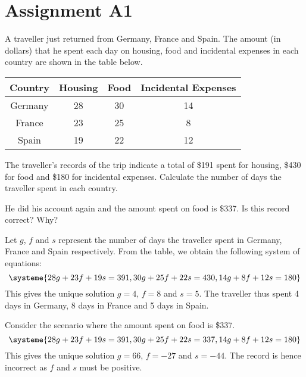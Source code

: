 \section{Assignment A1}

\begin{problem}
    A traveller just returned from Germany, France and Spain. The amount (in dollars) that he spent each day on housing, food and incidental expenses in each country are shown in the table below.
    \begin{table}[H]
        \centering
        \begin{tabular}{|c|c|c|c|}
        \hline
        \textbf{Country} & \textbf{Housing} & \textbf{Food} & \textbf{Incidental Expenses}  \\\hline
        Germany & 28      & 30   & 14                   \\\hline
        France  & 23      & 25   & 8                    \\\hline
        Spain   & 19      & 22   & 12 \\\hline                  
        \end{tabular}
    \end{table}
    The traveller's records of the trip indicate a total of \$191 spent for housing, \$430 for food and \$180 for incidental expenses. Calculate the number of days the traveller spent in each country.

    He did his account again and the amount spent on food is \$337. Is this record correct? Why?
\end{problem}
\begin{solution}
    Let $g$, $f$ and $s$ represent the number of days the traveller spent in Germany, France and Spain respectively. From the table, we obtain the following system of equations: \[\systeme{28g + 23f + 19s = 391,30g + 25f + 22s = 430,14g + 8f + 12s = 180}\] This gives the unique solution $g=4$, $f=8$ and $s=5$. The traveller thus spent 4 days in Germany, 8 days in France and 5 days in Spain. 

    Consider the scenario where the amount spent on food is \$337. \[\systeme{28g + 23f + 19s = 391,30g + 25f + 22s = 337,14g + 8f + 12s = 180}\] This gives the unique solution $g=66$, $f=-27$ and $s=-44$. The record is hence incorrect as $f$ and $s$ must be positive.
\end{solution}

